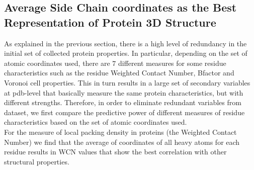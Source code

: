 \documentclass[11pt]{article}
\begin{document}
    \subsection*{Average Side Chain coordinates as the Best Representation of Protein 3D Structure}
        
        As explained in the previous section, there is a high level of redundancy in the initial set of collected protein properties. In particular, depending on the set of atomic coordinates used, there are $7$ different measures for some residue characteristics such as the residue Weighted Contact Number, Bfactor and Voronoi cell properties. This in turn results in a large set of secondary variables at pdb-level that basically measure the same protein characteristics, but with different strengths.  Therefore, in order to eliminate redundant variables from dataset, we first compare the predictive power of different measures of residue characteristics based on the set of atomic coordinates used. 
        \\
        
        For the measure of local packing density in proteins (the Weighted Contact Number) we find that the average of coordinates of all heavy atoms for each residue results in WCN values that show the best correlation with other structural properties.
        
\end{document}
